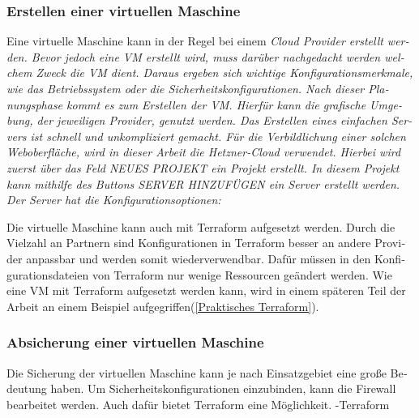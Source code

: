 \begin{otherlanguage}{ngerman}
\subsubsection{Erstellen einer virtuellen Maschine}
Eine virtuelle Maschine kann in der Regel bei einem \it Cloud Provider \rm erstellt werden.  Bevor jedoch eine VM erstellt wird, muss darüber nachgedacht werden welchem Zweck die VM dient. Daraus ergeben sich wichtige Konfigurationsmerkmale, wie das Betriebssystem oder die Sicherheitskonfigurationen. Nach dieser Planungsphase kommt es zum Erstellen der VM. Hierfür kann die grafische Umgebung, der jeweiligen Provider, genutzt werden. Das Erstellen eines einfachen Servers ist schnell und unkompliziert gemacht. Für die Verbildlichung einer solchen Weboberfläche, wird in dieser Arbeit die \it Hetzner-Cloud \rm verwendet. Hierbei wird zuerst über das Feld \dq NEUES PROJEKT\dq{} ein Projekt erstellt. In diesem Projekt kann mithilfe des Buttons \dq SERVER HINZUFÜGEN\dq{} ein Server erstellt werden. Der Server hat die Konfigurationsoptionen:
\newpage
\begin{acronym}
\end{acronym}
\newline
\newline
Die virtuelle Maschine kann auch mit Terraform aufgesetzt werden. Durch die Vielzahl an Partnern sind Konfigurationen in Terraform besser an andere Provider anpassbar und werden somit wiederverwendbar. Dafür müssen in den Konfigurationsdateien von Terraform nur wenige Ressourcen geändert werden. Wie eine VM mit Terraform aufgesetzt werden kann, wird in einem späteren Teil der Arbeit an einem Beispiel aufgegriffen(\ref{Praktisches Terraform}).

\subsubsection{Absicherung einer virtuellen Maschine}
Die Sicherung der virtuellen Maschine kann je nach Einsatzgebiet eine große Bedeutung haben. Um Sicherheitskonfigurationen einzubinden, kann die Firewall bearbeitet werden. Auch dafür bietet Terraform eine Möglichkeit. 
\newline 
-Terraform
\end{otherlanguage}